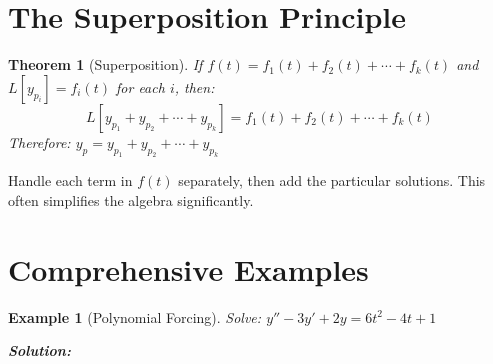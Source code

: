 \documentclass[12pt]{article}
\newtheorem{theorem}{Theorem}
\newtheorem{example}{Example}
\begin{document}
\section{The Superposition Principle}

\begin{theorem}[Superposition]
If $f(t) = f_1(t) + f_2(t) + \cdots + f_k(t)$ and $L[y_{p_i}] = f_i(t)$ for each $i$, then:
$$L[y_{p_1} + y_{p_2} + \cdots + y_{p_k}] = f_1(t) + f_2(t) + \cdots + f_k(t)$$
Therefore: $y_p = y_{p_1} + y_{p_2} + \cdots + y_{p_k}$
\end{theorem}

\begin{keypoint}
Handle each term in $f(t)$ separately, then add the particular solutions. This often simplifies the algebra significantly.
\end{keypoint}

\section{Comprehensive Examples}

\begin{example}[Polynomial Forcing]
Solve: $y'' - 3y' + 2y = 6t^2 - 4t + 1$

\textbf{Solution:}
\end{example}
\end{document}
